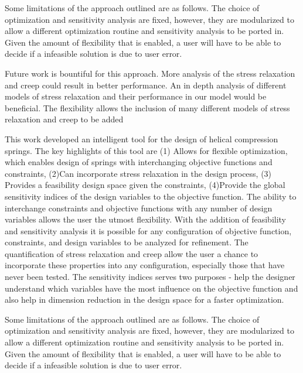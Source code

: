 \documentclass[10pt]{article}
\begin{document}
Some limitations of the approach outlined are as follows. The choice of optimization and sensitivity analysis are fixed, however, they are modularized to allow a different optimization routine and sensitivity analysis to be ported in. Given the amount of flexibility that is enabled, a user will have to be able to decide if a infeasible solution is due to user error. 

Future work is bountiful for this approach. More analysis of the stress relaxation and creep could result in better performance. An in depth analysis of different models of stress relaxation and their performance in our model would be beneficial. The flexibility allows the inclusion of many different models of stress relaxation and creep to be added

This work developed an intelligent tool for the design of helical compression springs. The key highlights of this tool are (1) Allows for flexible optimization, which enables design of springs with interchanging objective functions and constraints, (2)Can incorporate stress relaxation in the design process, (3) Provides a feasibility design space given the constraints, (4)Provide the global sensitivity indices of the design variables to the objective function. The ability to interchange constraints and objective functions with any number of design variables allows the user the utmost flexibility. With the addition of feasibility and sensitivity analysis it is possible for any configuration of objective function, constraints, and design variables to be analyzed for refinement. The quantification of stress relaxation and creep allow the user a chance to incorporate these properties into any configuration, especially those that have never been tested. The sensitivity indices serves two purposes - help the designer understand which variables have the most influence on the objective function and also help in dimension reduction in the design space for a faster optimization.

Some limitations of the approach outlined are as follows. The choice of optimization and sensitivity analysis are fixed, however, they are modularized to allow a different optimization routine and sensitivity analysis to be ported in. Given the amount of flexibility that is enabled, a user will have to be able to decide if a infeasible solution is due to user error. 

%
\end{document}
